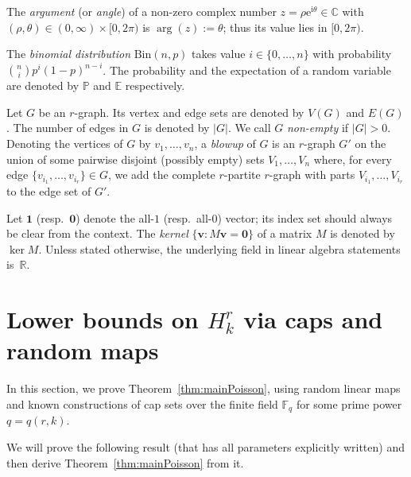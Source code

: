 \documentclass[10pt,a4paper]{article}
\numberwithin{equation}{section}
\theoremstyle{definition}
\theoremstyle{remark}
\newcommand{\V}[1]{\boldsymbol{#1}}
\newcommand{\me}{\mathrm{e}}
\begin{document}
The \emph{argument} (or \emph{angle}) of a non-zero complex number $z=\rho \me^{\mathrm{i}\theta}\in\mathbb C$ with $(\rho,\theta)\in (0,\infty)\times [0,2\pi)$ is 
$\arg(z):=\theta$; thus its value lies in $[0,2\pi)$.

The \emph{binomial distribution} $\mathrm{Bin}(n,p)$ takes value $i\in\{0,\dots,n\}$ with probability $\binom{n}{i}p^i(1-p)^{n-i}$. 
The probability and the expectation of a random variable are denoted by $\mathbb P$ and $\mathbb E$ respectively.


Let $G$ be an $r$-graph. Its vertex and edge sets are denoted by $V(G)$ and $E(G)$.  The number of edges in $G$ is denoted by $|G|$. We call $G$ \emph{non-empty} if $|G|>0$. %
Denoting the vertices of $G$ by $v_1,\dots,v_n$, 
a \emph{blowup} of $G$ is an $r$-graph $G'$ on the union of some pairwise disjoint (possibly empty) sets $V_1,\dots,V_n$ where, for every edge $\{v_{i_1},\dots,v_{i_r}\}\in G$, we add the complete $r$-partite $r$-graph with parts $V_{i_1},\dots,V_{i_r}$ to the edge set of $G'$.


Let $\mathbf 1$ (resp.\ $\V{0}$) denote the all-$1$ (resp.\ all-$0$) vector; its index set should always be clear from the context. The \emph{kernel} $\{\V{v}: M\V{v}=\V{0}\}$ of a matrix $M$ is denoted by $\ker M$. Unless stated otherwise, the underlying field in linear algebra statements is~$\mathbb R$.

\section{Lower bounds on \texorpdfstring{$H_k^r$}{Hkr} via caps and random maps}\label{sec:poisson}\label{sec:nolog}

In this section, we prove Theorem~\ref{thm:mainPoisson}, using random linear maps and known constructions of cap sets over the finite field $\mathbb F_q$ for some prime power $q=q(r,k)$.

We will prove the following result (that has all parameters explicitly written) and then derive Theorem~\ref{thm:mainPoisson} from it.
 
\end{document}
